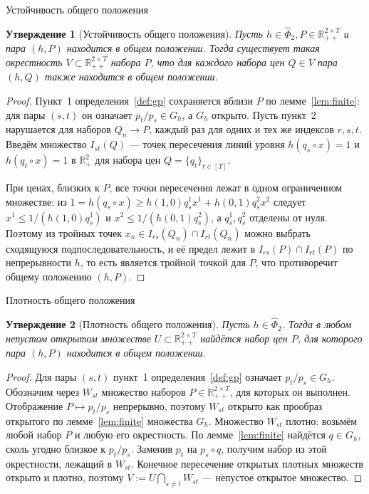 \documentclass[10pt,aspectratio=169]{beamer}
\theoremstyle{plain}
\newtheorem{prop}{Утверждение}
\theoremstyle{definition}
\newcommand{\R}{\mathbb{R}}
\newcommand{\Rpp}[1][2]{\R^{#1}_{++}}
\newcommand{\Rp}[1][2]{\R^{#1}_{+}}
\begin{document}
\setcounter{prop}{0}
\begin{frame}{Устойчивость общего положения}
    \begin{prop}[Устойчивость общего положения]\label{prop:stable}
        Пусть $h\in\hat\Phi_{2}, P\in\Rpp[2\times T]$ и пара $(h,P)$ находится в общем положении.
        Тогда существует такая окрестность $V\subset\Rpp[2\times T]$ набора $P$, что для каждого набора
        цен $Q\in V$ пара $(h,Q)$ также находится в общем положении.
    \end{prop}

    \begin{proof}
        Пункт~1 определения~\ref{def:gp} сохраняется вблизи $P$ по лемме~\ref{lem:finite}: для пары $(s,t)$ он означает $p_t/p_s\in G_h$, а $G_h$ открыто.
        Пусть пункт~2 нарушается для наборов $Q_n\to P$, каждый раз для одних и тех же индексов $r,s,t$. Введём множество $I_{st}(Q)$ --- точек пересечения линий уровня $h(q_s\circ x)=1$ и $h(q_t\circ x)=1$ в $\Rp$ для набора цен $Q=\{q_t\}_{t\in[T]}$.

        При ценах, близких к $P$, все точки пересечения лежат в одном ограниченном множестве: из $1=h(q_s\circ x)\ge h(1,0)q_s^1x^1+h(0,1)q_s^2x^2$ следует $x^1\le1/(h(1,0)q_s^1)$ и $x^2\le1/(h(0,1)q_s^2)$, а $q_s^1,q_s^2$ отделены от нуля. Поэтому из тройных точек $x_n\in I_{rs}(Q_n)\cap I_{rt}(Q_n)$ можно выбрать сходящуюся подпоследовательность, и её предел лежит в $I_{rs}(P)\cap I_{rt}(P)$ по непрерывности $h$, то есть является тройной точкой для $P$, что противоречит общему положению $(h,P)$.
    \end{proof}
\end{frame}

\begin{frame}{Плотность общего положения}
    \begin{prop}[Плотность общего положения]\label{prop:dense}
        Пусть $h\in\hat{\Phi}_{2}$. Тогда в любом непустом открытом множестве $U\subset\Rpp[2\times T]$
        найдётся набор цен $P$, для которого пара $(h,P)$ находится в общем положении.
    \end{prop}

    \begin{proof}
        Для пары $(s,t)$ пункт~1 определения~\ref{def:gp} означает $p_t/p_s\in G_h$. Обозначим через $W_{st}$ множество наборов $P\in\Rpp[2\times T]$, для которых он выполнен. Отображение $P\mapsto p_t/p_s$ непрерывно, поэтому $W_{st}$ открыто как прообраз открытого по лемме~\ref{lem:finite} множества $G_h$. Множество $W_{st}$ плотно: возьмём любой набор $P$ и любую его окрестность. По лемме~\ref{lem:finite} найдётся $q\in G_h$, сколь угодно близкое к $p_t/p_s$. Заменив $p_t$ на $p_s\circ q$, получим набор из этой окрестности, лежащий в $W_{st}$. Конечное пересечение открытых плотных множеств открыто и плотно, поэтому $V:=U\bigcap_{s\ne t}W_{st}$ --- непустое открытое множество.
    \end{proof}
\end{frame}
\end{document}
